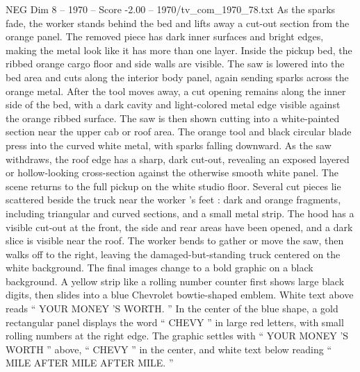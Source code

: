 \begin{textsample}{NEG Dim 8 – 1970 – Score -2.00 – 1970/tv\_com\_1970\_78.txt}
As the sparks fade, the worker stands behind the bed and lifts away a cut-out section from the orange panel.
The removed piece has dark inner surfaces and bright edges, making the metal look like it has more than one layer.
Inside the pickup bed, the ribbed orange cargo floor and side walls are visible.
The saw is lowered into the bed area and cuts along the interior body panel, again sending sparks across the orange metal.
After the tool moves away, a cut opening remains along the inner side of the bed, with a dark cavity and light-colored metal edge visible against the orange ribbed surface.
The saw is then shown cutting into a white-painted section near the upper cab or roof area.
The orange tool and black circular blade press into the curved white metal, with sparks falling downward.
As the saw withdraws, the roof edge has a sharp, dark cut-out, revealing an exposed layered or hollow-looking cross-section against the otherwise smooth white panel.
The scene returns to the full pickup on the white studio floor.
Several cut pieces lie scattered beside the truck near the worker ’s feet : dark and orange fragments, including triangular and curved sections, and a small metal strip.
The hood has a visible cut-out at the front, the side and rear areas have been opened, and a dark slice is visible near the roof.
The worker bends to gather or move the saw, then walks off to the right, leaving the damaged-but-standing truck centered on the white background.
The final images change to a bold graphic on a black background.
A yellow strip like a rolling number counter first shows large black digits, then slides into a blue Chevrolet bowtie-shaped emblem.
White text above reads “ YOUR MONEY ’S WORTH. ” In the center of the blue shape, a gold rectangular panel displays the word “ CHEVY ” in large red letters, with small rolling numbers at the right edge.
The graphic settles with “ YOUR MONEY ’S WORTH ” above, “ CHEVY ” in the center, and white text below reading “ MILE AFTER MILE AFTER MILE. ”

\end{textsample}
